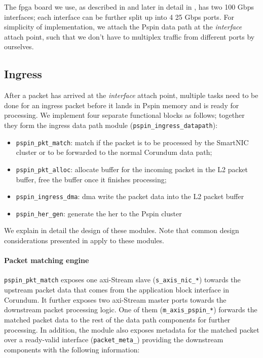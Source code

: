 The \ac{fpga} board we use, as described in  and later in detail in , has two 100 Gbps interfaces; each interface can be further split up into 4 25 Gbps ports.  For simplicity of implementation, we attach the P\acs{spin} data path at the \emph{interface} attach point, such that we don't have to multiplex traffic from different ports by ourselves.

\subsection{Ingress} \label{sec:ingress-datapath}

After a packet has arrived at the \emph{interface} attach point, multiple tasks need to be done for an ingress packet before it lands in P\acs{spin} memory and is ready for processing.  We implement four separate functional blocks as follows; together they form the ingress data path module (\texttt{pspin\_\-ingress\_\-datapath}):

\begin{itemize}
    \item \texttt{pspin\_\-pkt\_\-match}: match if the packet is to be processed by the SmartNIC cluster or to be forwarded to the normal Corundum data path;
    \item \texttt{pspin\_\-pkt\_\-alloc}: allocate buffer for the incoming packet in the L2 packet buffer, free the buffer once it finishes processing;
    \item \texttt{pspin\_\-ingress\_\-dma}: \ac{dma} write the packet data into the L2 packet buffer
    \item \texttt{pspin\_\-her\_\-gen}: generate the \ac{her} to the P\acs{spin} cluster
\end{itemize}

We explain in detail the design of these modules.  Note that common design considerations presented in  apply to these modules.

\paragraph{Packet matching engine} \texttt{pspin\_\-pkt\_\-match} exposes one \ac{axi}-Stream slave (\texttt{s\_\-axis\_\-nic\_\-*}) towards the upstream packet data that comes from the application block interface in Corundum.  It further exposes two \ac{axi}-Stream master ports towards the downstream packet processing logic.  One of them (\texttt{m\_\-axis\_\-pspin\_\-*}) forwards the matched packet data to the rest of the data path components for further processing.  In addition, the module also exposes metadata for the matched packet over a ready-valid interface (\texttt{packet\_\-meta\_\-}) providing the downstream components with the following information:

